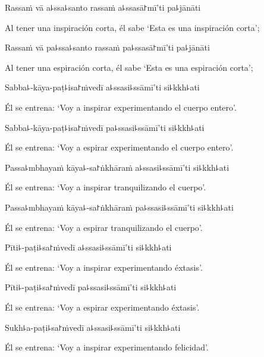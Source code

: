 Rassaṁ vā a꜕ssa꜕santo rassaṁ a꜕ssasā꜓mī'ti pa꜕jānāti

\begin{english}
  Al tener una inspiración corta, él sabe ‘Esta es una inspiración corta’;
\end{english}

Rassaṁ vā pa꜕ssa꜕santo rassaṁ pa꜕ssasā꜓mī'ti pa꜕jānāti

\begin{english}
  Al tener una espiración corta, él sabe ‘Esta es una espiración corta’;
\end{english}

Sabba꜕-kāya-paṭ꜕isa꜓ṁvedī a꜕ssasi꜕ssāmī'ti si꜕kkh꜕ati

\begin{english}
  Él se entrena: ‘Voy a inspirar experimentando el cuerpo entero’.
\end{english}

Sabba꜕-kāya-paṭ꜕isa꜓ṁvedī pa꜕ssasi꜕ssāmī'ti si꜕kkh꜕ati

\begin{english}
  Él se entrena: ‘Voy a espirar experimentando el cuerpo entero’.
\end{english}

Passa꜕mbhayaṁ kāya꜕-sa꜓ṅkhāraṁ a꜕ssasi꜕ssāmī'ti si꜕kkh꜕ati

\begin{english}
  Él se entrena: ‘Voy a inspirar tranquilizando el cuerpo’.
\end{english}

Passa꜕mbhayaṁ kāya꜕-sa꜓ṅkhāraṁ pa꜕ssasi꜕ssāmī'ti si꜕kkh꜕ati

\begin{english}
  Él se entrena: ‘Voy a espirar tranquilizando el cuerpo’.
\end{english}

Pīti꜕-paṭi꜕sa꜓ṁvedī a꜕ssasi꜕ssāmī'ti si꜕kkh꜕ati

\begin{english}
  Él se entrena: ‘Voy a inspirar experimentando éxtasis’.
\end{english}

Pīti꜕-paṭi꜕sa꜓ṁvedī pa꜕ssasi꜕ssāmī'ti si꜕kkh꜕ati

\begin{english}
  Él se entrena: ‘Voy a espirar experimentando éxtasis’.
\end{english}

Sukh꜕a-paṭi꜕sa꜓ṁvedī a꜕ssasi꜕ssāmī'ti si꜕kkh꜕ati

\begin{english}
  Él se entrena: ‘Voy a inspirar experimentando felicidad’.
\end{english}

